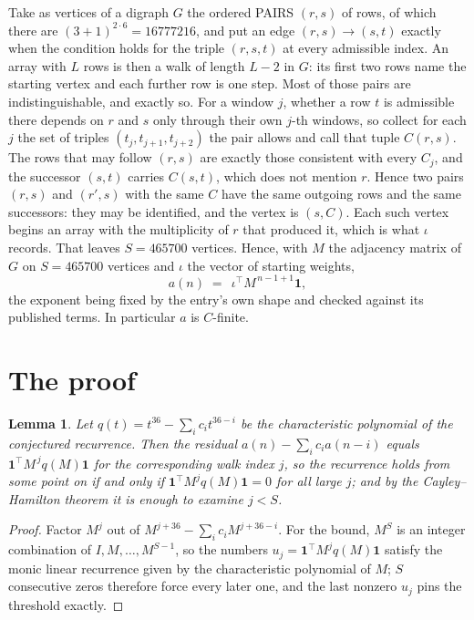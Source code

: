 \documentclass[11pt,a4paper]{article}
\theoremstyle{plain}
\newtheorem{lemma}[theorem]{Lemma}
\theoremstyle{definition}
\begin{document}
Take as vertices of a digraph $G$ the ordered PAIRS $(r,s)$ of rows, of which there are
$(3+1)^{2\cdot6}=16777216$, and put an edge $(r,s)\to(s,t)$ exactly when the condition
holds for the triple $(r,s,t)$ at every admissible index. An array with $L$ rows is then a
walk of length $L-2$ in $G$: its first two rows name the starting vertex and each further
row is one step. Most of those pairs are indistinguishable, and exactly so. For a window $j$, whether a row $t$ is admissible there depends on $r$ and $s$ only through their own $j$-th windows, so collect for each $j$ the set of triples $(t_j,t_{j+1},t_{j+2})$ the pair allows and call that tuple $C(r,s)$. The rows that may follow $(r,s)$ are exactly those consistent with every $C_j$, and the successor $(s,t)$ carries $C(s,t)$, which does not mention $r$. Hence two pairs $(r,s)$ and $(r',s)$ with the same $C$ have the same outgoing rows and the same successors: they may be identified, and the vertex is $(s,C)$. Each such vertex begins an array with the multiplicity of $r$ that produced it, which is what $\iota$ records. That leaves $S=465700$ vertices. Hence, with $M$ the adjacency matrix of $G$ on $S=465700$ vertices and
$\iota$ the vector of starting weights,
\[
a(n)\;=\;\,\iota^{\!\top}M^{\,n-1+1}\mathbf{1},
\]
the exponent being fixed by the entry's own shape and checked against its published terms.
In particular $a$ is $C$-finite.

\section{The proof}

\begin{lemma}\label{lem:crit}
Let $q(t)=t^{36}-\sum_i c_it^{36-i}$ be the characteristic polynomial of the
conjectured recurrence. Then the residual $a(n)-\sum_ic_ia(n-i)$ equals
$\mathbf{1}^{\!\top}M^{\,j}q(M)\mathbf{1}$ for the corresponding walk index
$j$, so the recurrence holds from some point on if and only if
$\mathbf{1}^{\!\top}M^{j}q(M)\mathbf{1}=0$ for all large $j$; and by the
Cayley--Hamilton theorem it is enough to examine $j<S$.
\end{lemma}

\begin{proof}
Factor $M^{j}$ out of $M^{j+36}-\sum_ic_iM^{j+36-i}$. For the bound, $M^{S}$
is an integer combination of $I,M,\dots,M^{S-1}$, so the numbers
$u_j=\mathbf{1}^{\!\top}M^{j}q(M)\mathbf{1}$ satisfy the monic linear recurrence given by
the characteristic polynomial of $M$; $S$ consecutive zeros therefore force every later one,
and the last nonzero $u_j$ pins the threshold exactly.
\end{proof}
\end{document}
